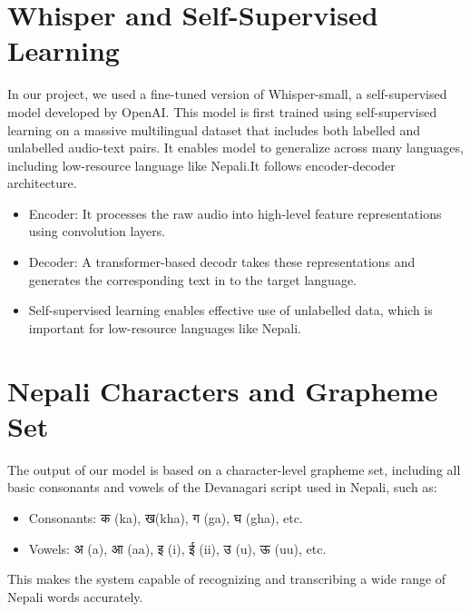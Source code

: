%

\section{Whisper and Self-Supervised Learning}
In our project, we used a fine-tuned version of Whisper-small, a self-supervised model developed by OpenAI. This model is first trained using self-supervised learning on a massive multilingual dataset that includes both labelled and unlabelled audio-text pairs.  It enables model to generalize across many languages, including low-resource language like Nepali.It follows encoder-decoder architecture. 





\begin{itemize}
    \item Encoder: It processes the raw audio into high-level feature representations using convolution layers.

    \item Decoder: A transformer-based decodr takes these representations and generates the corresponding text in to the target language.

    \item Self-supervised learning enables effective use of unlabelled data, which is important for low-resource languages like Nepali.

\end{itemize}


\section{Nepali Characters and Grapheme Set}
The output of our model is based on a character-level grapheme set, including all basic consonants and vowels of the Devanagari script used in Nepali, such as:
\begin{itemize}
    \item Consonants: क (ka), ख(kha), ग (ga), घ (gha), etc.
    \item Vowels: अ (a), आ (aa), इ (i), ई (ii), उ (u), ऊ (uu), etc.
\end{itemize}

This makes the system capable of recognizing and transcribing a wide range of Nepali words accurately.


